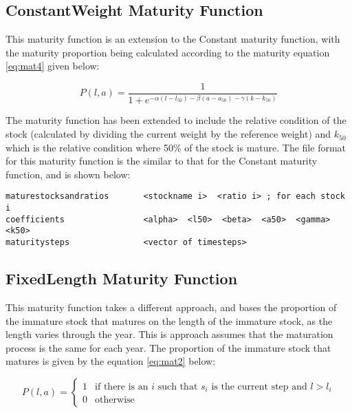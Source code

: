 \documentclass[]{book}
\begin{document}
\hypertarget{constantweight-maturity-function}{%
\subsection{ConstantWeight Maturity Function}\label{constantweight-maturity-function}}

This maturity function is an extension to the Constant maturity
function, with the maturity proportion being calculated according to the
maturity equation \eqref{eq:mat4} given below:

\begin{equation}
\label{eq:mat4}
P(l, a) = \frac{1}{ 1 + e^{-\alpha(l - l_{50}) -\beta(a - a_{50}) -\gamma(k - k_{50})}}\end{equation}

The maturity function has been extended to include the relative
condition of the stock (calculated by dividing the current weight by the
reference weight) and \(k_{50}\) which is the relative condition where 50\%
of the stock is mature. The file format for this maturity function is
the similar to that for the Constant maturity function, and is shown
below:

\begin{verbatim}
maturestocksandratios       <stockname i>  <ratio i> ; for each stock i
coefficients                <alpha>  <l50>  <beta>  <a50>  <gamma>  <k50>
maturitysteps               <vector of timesteps>
\end{verbatim}

\hypertarget{fixedlength-maturity-function}{%
\subsection{FixedLength Maturity Function}\label{fixedlength-maturity-function}}

This maturity function takes a different approach, and bases the
proportion of the immature stock that matures on the length of the
immature stock, as the length varies through the year. This is approach
assumes that the maturation process is the same for each year. The
proportion of the immature stock that matures is given by the
equation \eqref{eq:mat2} below:

\begin{equation}
\label{eq:mat2}
P(l, a) =
\begin{cases}
1 & \textrm{if there is an $i$ such that $s_i$ is the current step and $l > l_i$} \\
0 & \textrm{otherwise}
\end{cases}\end{equation}
\end{document}

